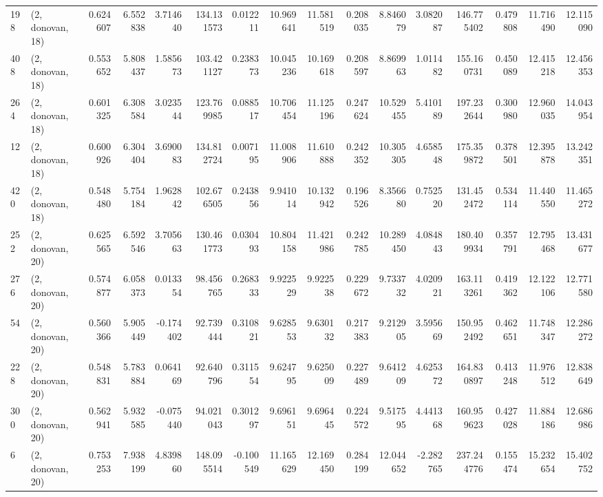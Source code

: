 \begin{tabular}{llrrrrrrrrrrrrrr}
198 &  (2, donovan, 18) &   0.624607 &   6.552838 &   3.714640 &   134.131573 &   0.012211 &  10.969641 &  11.581519 &  0.208035 &   8.846079 &   3.082087 &   146.775402 &   0.479808 &  11.716490 &  12.115090 \\
408 &  (2, donovan, 18) &   0.553652 &   5.808437 &   1.585673 &   103.421127 &   0.238373 &  10.045236 &  10.169618 &  0.208597 &   8.869963 &   1.011482 &   155.160731 &   0.450089 &  12.415218 &  12.456353 \\
264 &  (2, donovan, 18) &   0.601325 &   6.308584 &   3.023544 &   123.769985 &   0.088517 &  10.706454 &  11.125196 &  0.247624 &  10.529455 &   5.410189 &   197.232644 &   0.300980 &  12.960035 &  14.043954 \\
12  &  (2, donovan, 18) &   0.600926 &   6.304404 &   3.690083 &   134.812724 &   0.007195 &  11.008906 &  11.610888 &  0.242352 &  10.305305 &   4.658548 &   175.359872 &   0.378501 &  12.395878 &  13.242351 \\
420 &  (2, donovan, 18) &   0.548480 &   5.754184 &   1.962842 &   102.676505 &   0.243856 &   9.941014 &  10.132942 &  0.196526 &   8.356680 &   0.752520 &   131.452472 &   0.534114 &  11.440550 &  11.465272 \\
252 &  (2, donovan, 20) &   0.625565 &   6.592546 &   3.705663 &   130.461773 &   0.030493 &  10.804158 &  11.421986 &  0.242785 &  10.289450 &   4.084843 &   180.409934 &   0.357791 &  12.795468 &  13.431677 \\
276 &  (2, donovan, 20) &   0.574877 &   6.058373 &   0.013354 &    98.456765 &   0.268333 &   9.922529 &   9.922538 &  0.229672 &   9.733732 &   4.020921 &   163.113261 &   0.419362 &  12.122106 &  12.771580 \\
54  &  (2, donovan, 20) &   0.560366 &   5.905449 &  -0.174402 &    92.739444 &   0.310821 &   9.628553 &   9.630132 &  0.217383 &   9.212905 &   3.595669 &   150.952492 &   0.462651 &  11.748347 &  12.286272 \\
228 &  (2, donovan, 20) &   0.548831 &   5.783884 &   0.064169 &    92.640796 &   0.311554 &   9.624795 &   9.625009 &  0.227489 &   9.641209 &   4.625372 &   164.830897 &   0.413248 &  11.976512 &  12.838649 \\
300 &  (2, donovan, 20) &   0.562941 &   5.932585 &  -0.075440 &    94.021043 &   0.301297 &   9.696151 &   9.696445 &  0.224572 &   9.517595 &   4.441368 &   160.959623 &   0.427028 &  11.884186 &  12.686986 \\
6   &  (2, donovan, 20) &   0.753253 &   7.938199 &   4.839860 &   148.095514 &  -0.100549 &  11.165629 &  12.169450 &  0.284199 &  12.044652 &  -2.282765 &   237.244776 &   0.155474 &  15.232654 &  15.402752 \\

\end{tabular}
